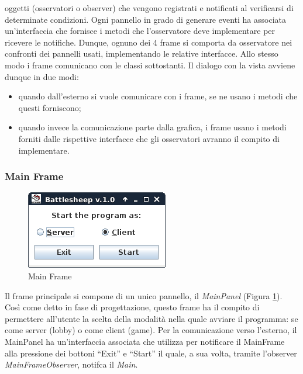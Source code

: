 oggetti (osservatori o observer) che vengono registrati e notificati
al verificarsi di determinate condizioni. Ogni pannello in grado di
generare eventi ha associata un'interfaccia che fornisce i metodi che
l'osservatore deve implementare per ricevere le notifiche. Dunque, ognuno dei 4
frame si comporta da osservatore nei confronti dei pannelli usati, implementando
le relative interfacce. Allo stesso modo i frame comunicano con le classi
sottostanti. Il dialogo con la vista avviene dunque in due modi:
\begin{itemize}
	\item quando dall'esterno si vuole comunicare con i frame, se ne usano i
	metodi che questi forniscono;
	\item quando invece la comunicazione parte dalla grafica, i frame usano i
	metodi forniti dalle rispettive interfacce che gli osservatori avranno il
	compito di implementare.
\end{itemize}



\subsubsection{Main Frame}
\begin{figure}[!h]
	\centering
	\includegraphics[scale=0.4]{core/imgs/gui/main_frame}
	\caption{Main Frame}
	\label{figure:main_frame}
\end{figure}
Il frame principale si compone di un unico pannello, il \textit{MainPanel} (Figura \ref{figure:main_frame}).
Così come detto in fase di progettazione,
questo frame ha il compito di
permettere all'utente la scelta della modalità nella quale avviare il programma:
se come server (lobby) o come client (game).\newline
Per la comunicazione verso l'esterno, il MainPanel ha un'interfaccia associata
che utilizza per notificare il MainFrame alla pressione dei bottoni ``Exit'' e
``Start'' il quale, a sua volta, tramite l'observer \textit{MainFrameObserver},
notifca il \textit{Main}.



